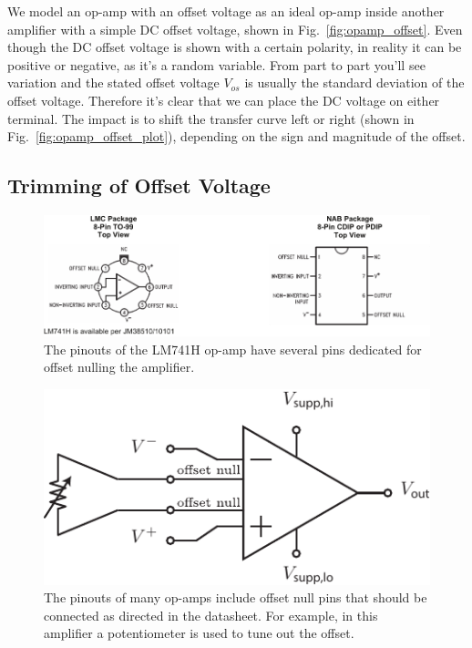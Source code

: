 We model an op-amp with an offset voltage as an ideal op-amp inside another amplifier with a simple DC offset voltage, shown in Fig.~\ref{fig:opamp_offset}.  Even though the DC offset voltage is shown with a certain polarity, in reality it can be positive or negative, as it's a random variable.  From part to part you'll see variation and the stated offset voltage $V_{os}$ is usually the standard deviation of the offset voltage.  Therefore it's clear that we can place the DC voltage on either terminal.  The impact is to shift the transfer curve left or right (shown in Fig.~\ref{fig:opamp_offset_plot}), depending on the sign and magnitude of the offset.



\subsection{Trimming of Offset Voltage}

\begin{figure}[tb]
\begin{center}
\includegraphics[width=1\columnwidth]{lm741_pinout}
\end{center}
\caption{The pinouts of the LM741H op-amp have several pins dedicated for offset nulling the amplifier.} \label{fig:lm741_pinout}
\end{figure}



\begin{figure}[tb]
\begin{center}
\includegraphics[scale=1]{opamp_pinout_offset}
\end{center}
\caption{The pinouts of many op-amps include offset null pins that should be connected as directed in the datasheet.  For example, in this amplifier a potentiometer is used to tune out the offset.} \label{fig:opamp_pinout_offset}
\end{figure}

